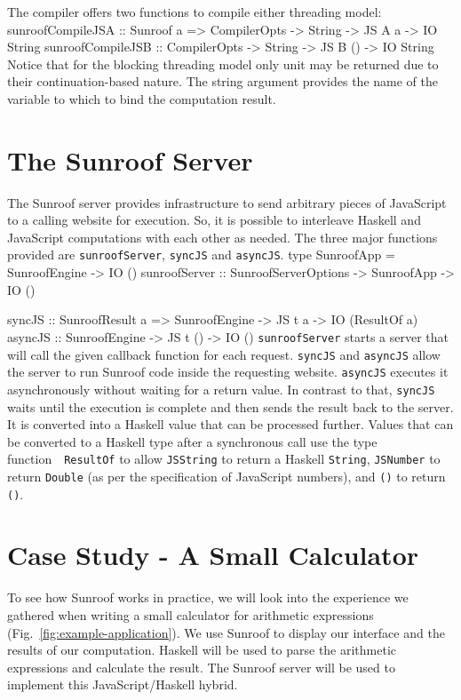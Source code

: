 \documentclass{llncs}
\newcommand{\Src}[1]{{\tt{#1}}}
\newenvironment{Code}{\verbatim}{\endverbatim}
\newcommand{\FigRef}[1]{Fig.~\ref{#1}}
\begin{document}
The compiler offers two functions to compile either threading 
model:
\begin{Code}
sunroofCompileJSA :: Sunroof a 
                  => CompilerOpts -> String -> JS A a  -> IO String
sunroofCompileJSB :: CompilerOpts -> String -> JS B () -> IO String
\end{Code}
Notice that for the blocking threading model only unit
may be returned due to their continuation-based nature. 
The string argument provides the name of the variable to which to
bind the computation result.

\section{The Sunroof Server}
\label{sec:server}

The Sunroof server provides infrastructure to send arbitrary pieces 
of JavaScript to a calling website for execution. 
So, it is possible to interleave Haskell and JavaScript 
computations with each other as needed. The three major functions
provided are \Src{sunroofServer}, \Src{syncJS} and \Src{asyncJS}.
\begin{Code}
type SunroofApp = SunroofEngine -> IO ()
sunroofServer :: SunroofServerOptions -> SunroofApp -> IO ()

syncJS  :: SunroofResult a 
        => SunroofEngine -> JS t a -> IO (ResultOf a)
asyncJS :: SunroofEngine -> JS t () -> IO ()
\end{Code}
\Src{sunroofServer} starts a server that will call the given callback function
for each request.
\Src{syncJS} and \Src{asyncJS} allow the server
to run Sunroof code inside the requesting website.
\Src{asyncJS} executes it asynchronously without 
waiting for a return value. In contrast to that, 
\Src{syncJS} waits until the execution is complete and
then sends the result back to the server. It
is converted into a Haskell value that can be processed further. 
Values that can be converted to a Haskell type after a synchronous
call use the type function~\cite{..}~\Src{ResultOf} to
allow \Src{JSString} to return a Haskell \Src{String}, 
\Src{JSNumber} to return \Src{Double} (as per the specification
of JavaScript numbers), and \Src{()} to return \Src{()}.

\section{Case Study - A Small Calculator}
\label{sec:extended-example}

To see how Sunroof works in practice, we will look into the 
experience we gathered when writing a small calculator
for arithmetic expressions (\FigRef{fig:example-application}). 
We use Sunroof to display our interface
and the results of our computation. Haskell will be used to parse the 
arithmetic expressions and calculate the result. The Sunroof server 
will be used to implement this JavaScript/Haskell hybrid.
\end{document}
